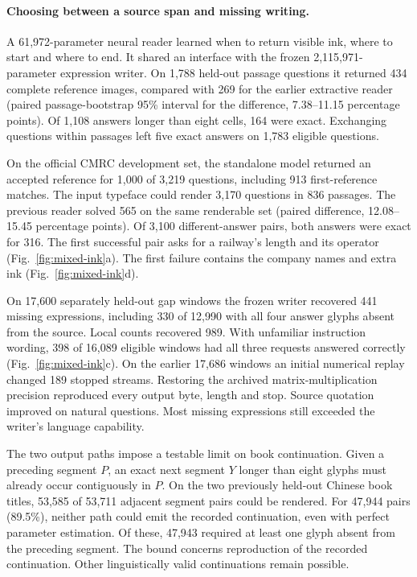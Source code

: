 \documentclass[12pt,a4paper]{article}
\providecommand{\DIFadd}[1]{{\protect\color{blue} \sf #1}} %
\begin{document}
\paragraph{\DIFadd{Choosing between a source span and missing writing.}}
\DIFadd{A 61,972-parameter neural reader learned when to return visible ink, where to start and where to end. It shared an interface with the frozen 2,115,971-parameter expression writer. On 1,788 held-out passage questions it returned 434 complete reference images, compared with 269 for the earlier extractive reader (paired passage-bootstrap 95\% interval for the difference, 7.38--11.15 percentage points). Of 1,108 answers longer than eight cells, 164 were exact. Exchanging questions within passages left five exact answers on 1,783 eligible questions.
}

\DIFadd{On the official CMRC development set, the standalone model returned an accepted reference for 1,000 of 3,219 questions, including 913 first-reference matches. The input typeface could render 3,170 questions in 836 passages. The previous reader solved 565 on the same renderable set (paired difference, 12.08--15.45 percentage points). Of 3,100 different-answer pairs, both answers were exact for 316. The first successful pair asks for a railway's length and its operator (Fig.~\ref{fig:mixed-ink}a). The first failure contains the company names and extra ink (Fig.~\ref{fig:mixed-ink}d).
}

\DIFadd{On 17,600 separately held-out gap windows the frozen writer recovered 441 missing expressions, including 330 of 12,990 with all four answer glyphs absent from the source. Local counts recovered 989. With unfamiliar instruction wording, 398 of 16,089 eligible windows had all three requests answered correctly (Fig.~\ref{fig:mixed-ink}c). On the earlier 17,686 windows an initial numerical replay changed 189 stopped streams. Restoring the archived matrix-multiplication precision reproduced every output byte, length and stop. Source quotation improved on natural questions. Most missing expressions still exceeded the writer's language capability.
}

\DIFadd{The two output paths impose a testable limit on book continuation. Given a preceding segment $P$, an exact next segment $Y$ longer than eight glyphs must already occur contiguously in $P$. On the two previously held-out Chinese book titles, 53,585 of 53,711 adjacent segment pairs could be rendered. For 47,944 pairs (89.5\%), neither path could emit the recorded continuation, even with perfect parameter estimation. Of these, 47,943 required at least one glyph absent from the preceding segment. The bound concerns reproduction of the recorded continuation. Other linguistically valid continuations remain possible.
}
\end{document}
